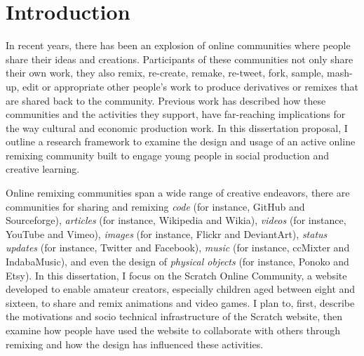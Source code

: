 \section{Introduction}

In recent years, there has been an explosion of online communities where people share their ideas and creations.
Participants of these communities not only share their own work, they also remix, re-create, remake, re-tweet, fork, sample, mash-up, edit or appropriate other people's work to produce derivatives or remixes that are shared back to the community.
Previous work has described how these communities and the activities they support, have far-reaching implications for the way cultural and economic production work.
In this dissertation proposal, I outline a research framework to examine the design and usage of an active online remixing community built to engage young people in social production and creative learning.

Online remixing communities span a wide range of creative endeavors, there are communities for sharing and remixing 
\emph{code} (for instance, GitHub and Sourceforge),
\emph{articles} (for instance, Wikipedia and Wikia), 
\emph{videos} (for instance, YouTube and Vimeo), 
\emph{images} (for instance, Flickr and DeviantArt), 
\emph{status updates} (for instance, Twitter and Facebook),
\emph{music} (for instance, ccMixter and IndabaMusic),
and even the design of \emph{physical objects} (for instance, Ponoko and Etsy).
In this dissertation, I focus on the Scratch Online Community, a website developed to enable amateur creators, especially children aged between eight and sixteen, to share and remix animations and video games.
I plan to, first, describe the motivations and socio technical infrastructure of the Scratch website, then examine how people have used the website to collaborate with others through remixing and how the design has influenced these activities.
